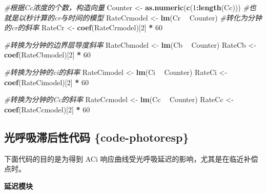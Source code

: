 \documentclass[
]{krantz}
\makeatletter
\newenvironment{Shaded}{\begin{snugshade}}{\end{snugshade}}
\newcommand{\CommentTok}[1]{\textcolor[rgb]{0.56,0.35,0.01}{\textit{#1}}}
\newcommand{\DecValTok}[1]{\textcolor[rgb]{0.00,0.00,0.81}{#1}}
\newcommand{\KeywordTok}[1]{\textcolor[rgb]{0.13,0.29,0.53}{\textbf{#1}}}
\newcommand{\NormalTok}[1]{#1}
\newcommand{\OperatorTok}[1]{\textcolor[rgb]{0.81,0.36,0.00}{\textbf{#1}}}
\newcommand{\StringTok}[1]{\textcolor[rgb]{0.31,0.60,0.02}{#1}}
\newenvironment{kframe}{%
\medskip{}
\setlength{\fboxsep}{.8em}
 \def\at@end@of@kframe{}%
 \ifinner\ifhmode%
  \def\at@end@of@kframe{\end{minipage}}%
  \begin{minipage}{\columnwidth}%
 \fi\fi%
 \def\FrameCommand##1{\hskip\@totalleftmargin \hskip-\fboxsep
 \colorbox{shadecolor}{##1}\hskip-\fboxsep
     \hskip-\linewidth \hskip-\@totalleftmargin \hskip\columnwidth}%
 \MakeFramed {\advance\hsize-\width
   \@totalleftmargin\z@ \linewidth\hsize
   \@setminipage}}%
 {\par\unskip\endMakeFramed%
 \at@end@of@kframe}
\renewenvironment{Shaded}{\begin{kframe}}{\end{kframe}}
\makeatother
\begin{document}
\begin{Shaded}
\begin{Highlighting}[]
\CommentTok{#根据Cc浓度的个数，构造向量}
\NormalTok{Counter <-}\StringTok{ }\KeywordTok{as.numeric}\NormalTok{(}\KeywordTok{c}\NormalTok{(}\DecValTok{1}\OperatorTok{:}\KeywordTok{length}\NormalTok{(Cc)))}
\CommentTok{#也就是以秒计算的cr与时间的模型}
\NormalTok{RateCrmodel <-}\StringTok{ }\KeywordTok{lm}\NormalTok{(Cr }\OperatorTok{~}\StringTok{ }\NormalTok{Counter)}
\CommentTok{#转化为分钟的cr的斜率}
\NormalTok{RateCr <-}\StringTok{ }\KeywordTok{coef}\NormalTok{(RateCrmodel)[}\DecValTok{2}\NormalTok{] }\OperatorTok{*}\StringTok{ }\DecValTok{60}

\CommentTok{#转换为分钟的边界层导度斜率}
\NormalTok{RateCbmodel <-}\StringTok{ }\KeywordTok{lm}\NormalTok{(Cb }\OperatorTok{~}\StringTok{ }\NormalTok{Counter)}
\NormalTok{RateCb <-}\StringTok{ }\KeywordTok{coef}\NormalTok{(RateCbmodel)[}\DecValTok{2}\NormalTok{] }\OperatorTok{*}\StringTok{ }\DecValTok{60}

\CommentTok{#转换为分钟的ci的斜率}
\NormalTok{RateCimodel <-}\StringTok{ }\KeywordTok{lm}\NormalTok{(Ci }\OperatorTok{~}\StringTok{ }\NormalTok{Counter)}
\NormalTok{RateCi <-}\StringTok{ }\KeywordTok{coef}\NormalTok{(RateCimodel)[}\DecValTok{2}\NormalTok{] }\OperatorTok{*}\StringTok{ }\DecValTok{60}

\CommentTok{#转换为分钟的Cc的斜率}
\NormalTok{RateCcmodel <-}\StringTok{ }\KeywordTok{lm}\NormalTok{(Cc }\OperatorTok{~}\StringTok{ }\NormalTok{Counter)}
\NormalTok{RateCc <-}\StringTok{ }\KeywordTok{coef}\NormalTok{(RateCcmodel)[}\DecValTok{2}\NormalTok{] }\OperatorTok{*}\StringTok{ }\DecValTok{60} 
\end{Highlighting}
\end{Shaded}

\hypertarget{code-photoresp}{%
\subsection{光呼吸滞后性代码 \{code-photoresp\}}\label{code-photoresp}}

下面代码的目的是为得到 ACi 响应曲线受光呼吸延迟的影响，尤其是在临近补偿点时。

\textbf{延迟模块}
\end{document}
